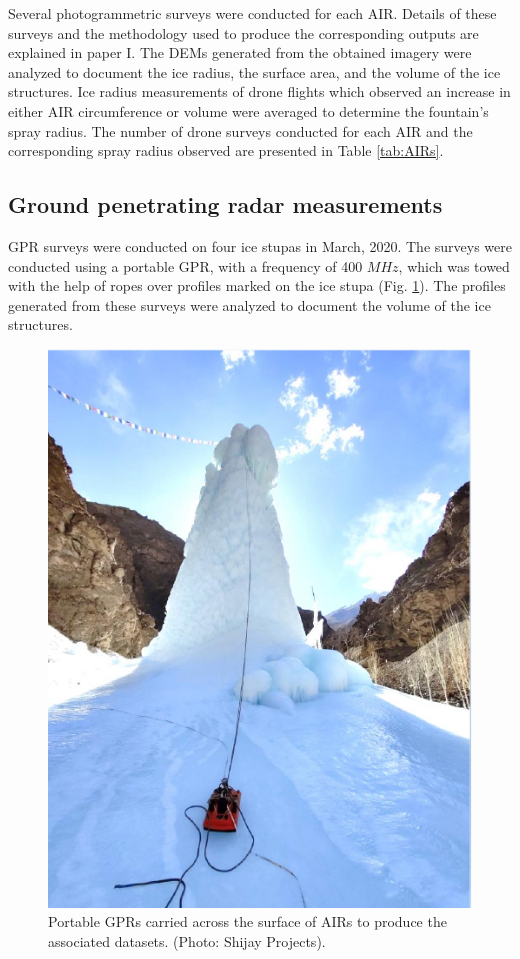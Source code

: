 Several photogrammetric surveys were conducted for each \ac{AIR}. Details of these surveys and the
methodology used to produce the corresponding outputs are explained in paper I. The
\ac{DEMs} generated from the obtained imagery were analyzed to document the ice radius, the surface area, and the
volume of the ice structures. Ice radius measurements of drone flights which observed an increase in either \ac{AIR}
circumference or volume were averaged to determine the fountain's spray radius. The number of drone surveys
conducted for each \Ac{AIR} and the corresponding spray radius observed are presented in Table \ref{tab:AIRs}.

\subsection{Ground penetrating radar measurements}

\ac{GPR} surveys were conducted on four ice stupas in March, 2020. The surveys were conducted using a portable
\ac{GPR}, with a frequency of 400 $MHz$, which was towed with the help of ropes over profiles marked on the ice
stupa (Fig. \ref{fig:gpr_survey}). The profiles generated from these surveys were analyzed to document the
volume of the ice structures. 

\begin{figure}
  \centering
	\includegraphics[width=8 cm]{figs/gpr_survey}
  \caption{Portable \ac{GPR}s carried across the surface of \ac{AIRs} to produce the associated datasets.
    (Photo: Shijay Projects).}
	\label{fig:gpr_survey}
\end{figure}

